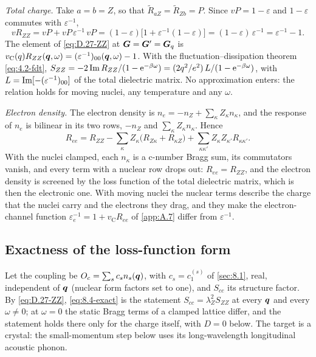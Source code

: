 \emph{Total charge.} Take $a = b = Z$, so that $\tilde R_{aZ} = \tilde R_{Zb} = P$. Since $vP = 1 - \varepsilon$ and $1 - \varepsilon$ commutes with $\varepsilon^{-1}$,
\begin{equation}
  vR_{ZZ} = vP + vP\,\varepsilon^{-1}\,vP = (1 - \varepsilon)\bigl[1 + \varepsilon^{-1}(1 - \varepsilon)\bigr] = (1 - \varepsilon)\,\varepsilon^{-1} = \varepsilon^{-1} - 1 .
  \label{eq:D.27-ZZ}
\end{equation}
The element of \cref{eq:D.27-ZZ} at $\bm{G} = \bm{G}' = \bm{G}_q$ is $v_{\mathrm{C}}(q)R_{ZZ}(\bm{q},\omega) = (\varepsilon^{-1})_{00}(\bm{q},\omega) - 1$. With the fluctuation--dissipation theorem \cref{eq:4.2-fdt}, $S_{ZZ} = -2\operatorname{Im} R_{ZZ}/(1 - \mathrm{e}^{-\beta\omega}) = (2q^2/e^2)\,L/(1 - \mathrm{e}^{-\beta\omega})$, with $L = \operatorname{Im}[-(\varepsilon^{-1})_{00}]$ of the total dielectric matrix. No approximation enters: the relation holds for moving nuclei, any temperature and any $\omega$.

\emph{Electron density.} The electron density is $n_e = -n_Z + \sum_\kappa Z_\kappa n_\kappa$, and the response of $n_e$ is bilinear in its two rows, $-n_Z$ and $\sum_\kappa Z_\kappa n_\kappa$. Hence
\begin{equation}
  R_{ee} = R_{ZZ} - \sum_\kappa Z_\kappa\bigl(R_{Z\kappa} + R_{\kappa Z}\bigr) + \sum_{\kappa\kappa'}Z_\kappa Z_{\kappa'}R_{\kappa\kappa'} .
  \label{eq:D.27-ee}
\end{equation}
With the nuclei clamped, each $n_\kappa$ is a c-number Bragg sum, its commutators vanish, and every term with a nuclear row drops out: $R_{ee} = R_{ZZ}$, and the electron density is screened by the loss function of the total dielectric matrix, which is then the electronic one. With moving nuclei the nuclear terms describe the charge that the nuclei carry and the electrons they drag, and they make the electron-channel function $\varepsilon_e^{-1} = 1 + v_{\mathrm{C}}R_{ee}$ of \cref{app:A.7} differ from $\varepsilon^{-1}$.

\subsection{Exactness of the loss-function form}

Let the coupling be $O_c = \sum_sc_sn_s(\bm{q})$, with $c_s = c_1^{(s)}$ of \cref{sec:8.1}, real, independent of $\bm{q}$ (nuclear form factors set to one), and $S_{cc}$ its structure factor. By \cref{eq:D.27-ZZ}, \cref{eq:8.4-exact} is the statement $S_{cc} = \lambda_Z^2S_{ZZ}$ at every $\bm{q}$ and every $\omega \neq 0$; at $\omega = 0$ the static Bragg terms of a clamped lattice differ, and the statement holds there only for the charge itself, with $D = 0$ below. The target is a crystal: the small-momentum step below uses its long-wavelength longitudinal acoustic phonon.

